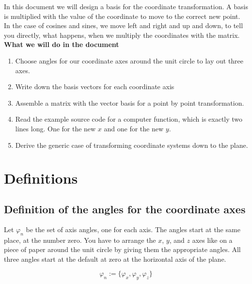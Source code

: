 \documentclass[a4paper]{article}
\begin{document}
In this document we will design a basis for the coordinate transformation. A
basis is multiplied with the value of the coordinate to move to the correct new point.\\
In the case of cosines and sines, we move left and right and up and down, to 
tell you directly, what happens, when we multiply the coordinates with the matrix.\\

\textbf{What we will do in the document}

\begin{enumerate}
\item Choose angles for our coordinate axes around the unit circle to lay out three axes.
\item Write down the basis vectors for each coordinate axis
\item Assemble a matrix with the vector basis for a point by point transformation.
\item Read the example source code for a computer function, which is exactly two lines long. One for the new $x$ and one for the new $y$.
\item Derive the generic case of transforming coordinate systems down to the plane.
\end{enumerate}

\section{Definitions}

\subsection{Definition of the angles for the coordinate axes}

 Let $\varphi_n$ be the set of axis angles, one for each axis. The angles start
at the same place, at the number zero. You have to arrange the $x$, $y$, and
$z$ axes like on a piece of paper around the unit circle by giving them the
appropriate angles. All three angles start at the default at zero at the horizontal axis of the plane.


\begin{displaymath}
\varphi_n := \{\varphi_x, \varphi_y, \varphi_z\}
\end{displaymath}
\end{document}
